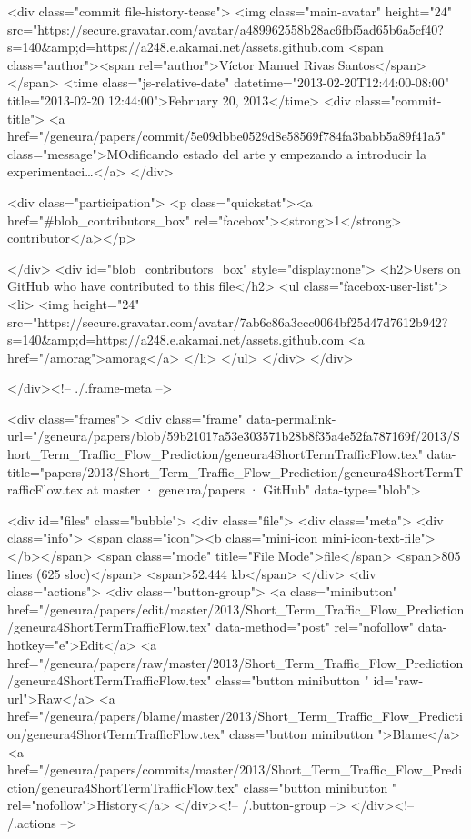         
  <div class="commit file-history-tease">
    <img class="main-avatar" height="24" src="https://secure.gravatar.com/avatar/a489962558b28ac6fbf5ad65b6a5cf40?s=140&amp;d=https://a248.e.akamai.net/assets.github.com%
    <span class="author"><span rel="author">Víctor Manuel Rivas Santos</span></span>
    <time class="js-relative-date" datetime="2013-02-20T12:44:00-08:00" title="2013-02-20 12:44:00">February 20, 2013</time>
    <div class="commit-title">
        <a href="/geneura/papers/commit/5e09dbbe0529d8e58569f784fa3babb5a89f41a5" class="message">MOdificando estado del arte y empezando a introducir la experimentaci…</a>
    </div>

    <div class="participation">
      <p class="quickstat"><a href="#blob_contributors_box" rel="facebox"><strong>1</strong> contributor</a></p>
      
    </div>
    <div id="blob_contributors_box" style="display:none">
      <h2>Users on GitHub who have contributed to this file</h2>
      <ul class="facebox-user-list">
        <li>
          <img height="24" src="https://secure.gravatar.com/avatar/7ab6c86a3ccc0064bf25d47d7612b942?s=140&amp;d=https://a248.e.akamai.net/assets.github.com%
          <a href="/amorag">amorag</a>
        </li>
      </ul>
    </div>
  </div>


    </div><!-- ./.frame-meta -->

    <div class="frames">
      <div class="frame" data-permalink-url="/geneura/papers/blob/59b21017a53e303571b28b8f35a4e52fa787169f/2013/Short_Term_Traffic_Flow_Prediction/geneura4ShortTermTrafficFlow.tex" data-title="papers/2013/Short_Term_Traffic_Flow_Prediction/geneura4ShortTermTrafficFlow.tex at master · geneura/papers · GitHub" data-type="blob">

        <div id="files" class="bubble">
          <div class="file">
            <div class="meta">
              <div class="info">
                <span class="icon"><b class="mini-icon mini-icon-text-file"></b></span>
                <span class="mode" title="File Mode">file</span>
                  <span>805 lines (625 sloc)</span>
                <span>52.444 kb</span>
              </div>
              <div class="actions">
                <div class="button-group">
                        <a class="minibutton"
                           href="/geneura/papers/edit/master/2013/Short_Term_Traffic_Flow_Prediction/geneura4ShortTermTrafficFlow.tex"
                           data-method="post" rel="nofollow" data-hotkey="e">Edit</a>
                  <a href="/geneura/papers/raw/master/2013/Short_Term_Traffic_Flow_Prediction/geneura4ShortTermTrafficFlow.tex" class="button minibutton " id="raw-url">Raw</a>
                    <a href="/geneura/papers/blame/master/2013/Short_Term_Traffic_Flow_Prediction/geneura4ShortTermTrafficFlow.tex" class="button minibutton ">Blame</a>
                  <a href="/geneura/papers/commits/master/2013/Short_Term_Traffic_Flow_Prediction/geneura4ShortTermTrafficFlow.tex" class="button minibutton " rel="nofollow">History</a>
                </div><!-- /.button-group -->
              </div><!-- /.actions -->

